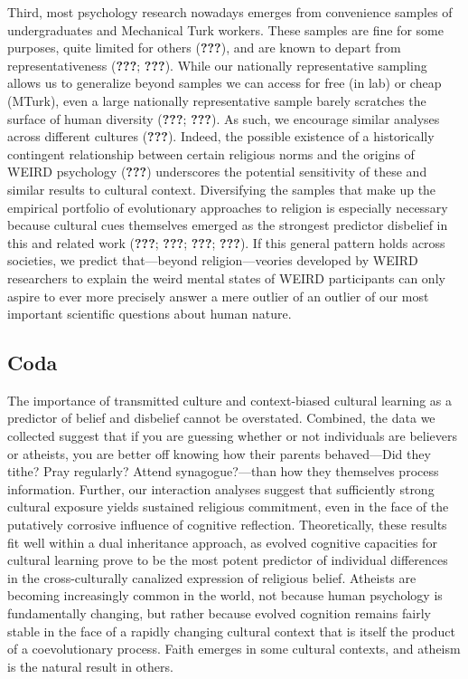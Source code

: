 \documentclass[english,man,mask]{article}
\begin{document}
Third, most psychology research nowadays emerges from convenience samples of undergraduates and Mechanical Turk workers. These samples are fine for some purposes, quite limited for others ({\textbf{???}}), and are known to depart from representativeness ({\textbf{???}}; {\textbf{???}}). While our nationally representative sampling allows us to generalize beyond samples we can access for free (in lab) or cheap (MTurk), even a large nationally representative sample barely scratches the surface of human diversity ({\textbf{???}}; {\textbf{???}}). As such, we encourage similar analyses across different cultures ({\textbf{???}}). Indeed, the possible existence of a historically contingent relationship between certain religious norms and the origins of WEIRD psychology ({\textbf{???}}) underscores the potential sensitivity of these and similar results to cultural context. Diversifying the samples that make up the empirical portfolio of evolutionary approaches to religion is especially necessary because cultural cues themselves emerged as the strongest predictor disbelief in this and related work ({\textbf{???}}; {\textbf{???}}; {\textbf{???}}; {\textbf{???}}). If this general pattern holds across societies, we predict that---beyond religion---veories developed by WEIRD researchers to explain the weird mental states of WEIRD participants can only aspire to ever more precisely answer a mere outlier of an outlier of our most important scientific questions about human nature.

\hypertarget{coda}{%
\subsection{Coda}\label{coda}}

The importance of transmitted culture and context-biased cultural learning as a predictor of belief and disbelief cannot be overstated. Combined, the data we collected suggest that if you are guessing whether or not individuals are believers or atheists, you are better off knowing how their parents behaved---Did they tithe? Pray regularly? Attend synagogue?---than how they themselves process information. Further, our interaction analyses suggest that sufficiently strong cultural exposure yields sustained religious commitment, even in the face of the putatively corrosive influence of cognitive reflection. Theoretically, these results fit well within a dual inheritance approach, as evolved cognitive capacities for cultural learning prove to be the most potent predictor of individual differences in the cross-culturally canalized expression of religious belief. Atheists are becoming increasingly common in the world, not because human psychology is fundamentally changing, but rather because evolved cognition remains fairly stable in the face of a rapidly changing cultural context that is itself the product of a coevolutionary process. Faith emerges in some cultural contexts, and atheism is the natural result in others.
\end{document}
